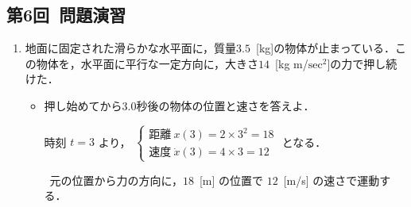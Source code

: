 \documentclass[a4paper,11pt]{ltjsarticle}
\begin{document}
\clearpage

\subsection{第6回\ 問題演習}

\begin{enumerate}
  \item 地面に固定された滑らかな水平面に，質量$3.5$\ [kg]の物体が止まっている．この物体を，水平面に平行な一定方向に，大きさ$14$\ [kg \cdot m/$\mathrm{sec}^{2}$]の力で押し続けた．
  \begin{itemize}
    \begin{equation}
      \renewcommand{\arraystretch}{2}
      \begin{array}{rl}
        &\ m \ddot{x} = \bm{F}
        \\
        \Leftrightarrow
        &\ 3.5 \ddot{x}(t) = 14
        \\
        \Leftrightarrow
        &\ \dot{x}(t) = At + B
        \\
        \Leftrightarrow
        &\ x(t) = 2t^{2} + Ct + D
        \\
      \end{array}
    \end{equation}
    初期条件より，
    $
    \begin{cases}
      x(0)=0 \\
      \dot{x}(0)=0
    \end{cases}
    $
    となる．\\
    初期条件を考慮に入れると，
    $
    \begin{cases}
      距離\ x(t)=2t^{2} \\
      速度\ \dot{x}(t)=4t
    \end{cases}
    $ となる． 
    \item 押し始めてから$3.0$秒後の物体の位置と速さを答えよ．

    時刻 $t=3$ より，
    $
    \begin{cases}
      距離\ x(3)=2 \times 3^{2} = 18 \\
      速度\ \dot{x}(3) = 4 \times 3 =12
    \end{cases}
    $ となる．


\begin{center}
  \therefore\ 元の位置から力の方向に，$18$\ [m] の位置で $12$\ [m/s] の速さで運動する．
\end{center}


\end{itemize}
\end{enumerate}
\end{document}

